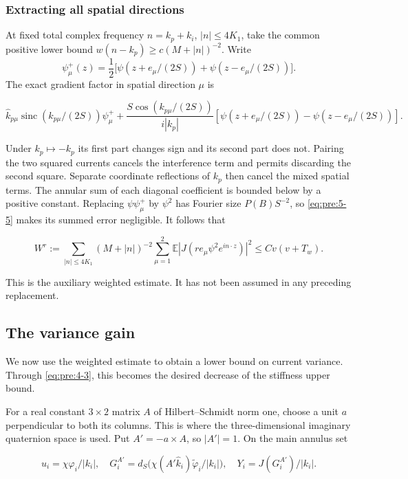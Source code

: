 \subsubsection{Extracting all spatial directions}\label{pre:part-6-3}

At fixed total complex frequency \(n=k_p+k_i\), \(|n|\leq4K_1\), take the common positive lower bound
\(w(n-k_p)\geq c(M+|n|)^{-2}\). Write
\[
 \psi_\mu^+(z)=\frac12\bigl[\psi(z+e_\mu/(2S))+
                         \psi(z-e_\mu/(2S))\bigr].
\]
The exact gradient factor in spatial direction \(\mu\) is

\[
\widehat k_{p\mu}\operatorname{sinc}(k_{p\mu}/(2S))\psi_\mu^+
+\frac{S\cos(k_{p\mu}/(2S))}{i|k_p|}
[\psi(z+e_\mu/(2S))-\psi(z-e_\mu/(2S))].
\]

Under \(k_p\mapsto-k_p\) its first part changes sign and its second part does not. Pairing the two squared currents cancels the interference term and permits discarding the second square. Separate coordinate reflections of \(k_p\) then cancel the mixed spatial terms. The annular sum of each diagonal coefficient is bounded below by a positive constant. Replacing \(\psi\psi_\mu^+\) by \(\psi^2\) has Fourier size \(P(B)S^{-2}\), so \eqref{eq:pre:5-5} makes its summed error negligible. It follows that

\begin{equation}
\boxed{\quad
W^r:=\sum_{|n|\leq4K_1}(M+|n|)^{-2}
\sum_{\mu=1}^2\mathbb E|J(r e_\mu\psi^2e^{in\cdot z})|^2
\leq Cv(v+T_w).\quad}
\label{eq:pre:6-7}
\end{equation}

This is the auxiliary weighted estimate. It has not been assumed in any preceding replacement.


\subsection{The variance gain}\label{pre:variance}

We now use the weighted estimate to obtain a lower bound on current
variance. Through \eqref{eq:pre:4-3}, this becomes the desired decrease
of the stiffness upper bound.

For a real constant \(3\times2\) matrix \(A\) of Hilbert--Schmidt norm one, choose a unit \(a\) perpendicular to both its columns. This is where the three-dimensional imaginary quaternion space is used. Put \(A'=-a\times A\), so \(|A'|=1\). On the main annulus set

\[
u_i=\chi\varphi_i/|k_i|,\quad
G_i^{A'}=d_S\bigl(\chi(A'\widehat k_i)\widetilde\varphi_i/|k_i|\bigr),\quad
Y_i=J(G_i^{A'})/|k_i|.
\]

